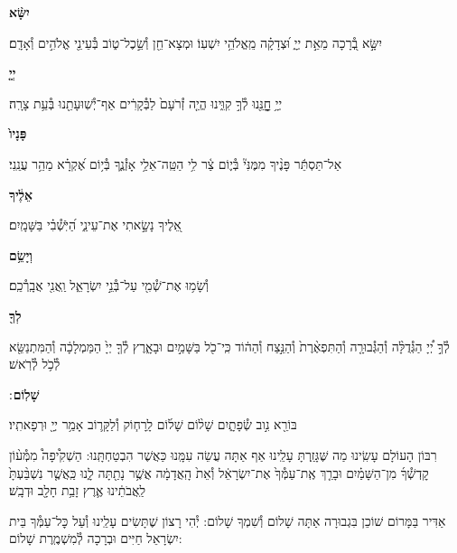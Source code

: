 \documentclass[twoside, openany, parskip=half, 11pt]{book}
\begin{document}
\textbf{יִשָּׂ֨א}
\hfill \begin{footnotesize}
יִשָּׂ֣א בְ֭֯רָכָה מֵאֵ֣ת יְיָ֑ וּ֝צְדָקָ֗ה מֵֽאֱלֹהֵ֥י יִשְׁעֽוֹ׃ וּמְצָא־חֵ֖ן וְ֯שֵׂ֣כֶל־ט֑וֹב בְּ֯עֵינֵ֖י אֱלֹהִ֣ים וְ֯אָדָֽם׃\\
\end{footnotesize}
\textbf{יְיָ֤}
\hfill \begin{footnotesize}
יְיָ֥ חׇׇׇׇׇנֵּ֖נוּ לְ֯ךָ֣ קִוִּ֑ינוּ הֱיֵ֤ה זְ֯רֹעָם֙ לַבְּ֯קָרִ֔ים אַף־יְ֯שֽׁוּעָתֵ֖נוּ בְּ֯עֵ֥ת צָרָֽה׃\\
\end{footnotesize}
\textbf{פָּנָיו֙}
\hfill \begin{footnotesize}
אַל־תַּסְתֵּ֬ר פָּנֶ֨יךָ מִמֶּנִּי֘ בְּ֯י֢וֹם צַ֫ר לִ֥י הַטֵּֽה־אֵלַ֥י אָזְ֯נֶ֑ךָ
בְּ֯י֥וֹם אֶ֝קְרָ֗א מַהֵ֥ר עֲנֵֽנִי׃\\
\end{footnotesize}
\textbf{אֵלֶ֔יךָ}
\hfill \begin{footnotesize}
אֵ֭לֶיךָ נָשָׂ֣אתִי אֶת־עֵינַ֑י הַ֝יֹּֽשְׁ֯בִ֗י בַּשָּׁמָֽיִם׃\\
\end{footnotesize}
\textbf{וְיָשֵׂ֥ם}
\hfill \begin{footnotesize}
וְ֯שָׂמ֥וּ אֶת־שְׁ֯מִ֖י עַל־בְּ֯נֵ֣י יִשְׂרָאֵ֑ל וַֽאֲנִ֖י אֲבָֽרְ֯כֵֽם׃\\
\end{footnotesize}
\textbf{לְךָ֖}
\hfill \begin{footnotesize}
לְ֯ךָ֣ יְ֠יָ הַגְּ֯דֻלָּ֨ה וְ֯הַגְּ֯בוּרָ֤ה וְ֯הַתִּפְאֶ֨רֶת֙ וְ֯הַנֵּ֣צַח וְ֯הַה֔וֹד
כִּֽי־כֹ֖ל בַּשָּׁמַ֣יִם וּבָאָ֑רֶץ לְ֯ךָ֤ יְיָ֙ הַמַּמְלָכָ֔ה וְ֯הַמִּתְנַשֵּׂ֖א
לְ֯כֹ֥ל לְ֯רֹֽאשׁ׃\\
\end{footnotesize}
\textbf{שָׁלֽוֹם}
׃ \hfill \begin{footnotesize}
בּוֹרֵ֖א נִ֣וב שְׂ֯פָתָ֑יִם שָׁל֨וֹם שָׁל֜וֹם לָֽרָח֧וֹק וְ֯לַקָּר֛וֹב
אָמַ֥ר יְיָ֖ וּרְפָאתִֽיו׃
\end{footnotesize}

\clearpage

\begin{paracol}{2}
רִבּוֹן הָעוֹלָם עָשִֽׂינוּ מַה שֶּׁגָּזַֽרְתָּ עָלֵֽינוּ אַף אַתָּה עֲשֵׂה עִמָּֽנוּ כַּאֲשֶׁר הִבְטַחְתָּֽנוּ: הַשְׁקִ֩יפָה֩ מִמְּ֯ע֨וֹן קׇדְשְׁ֯ךָ֜ מִן־הַשָּׁמַ֗יִם וּבָרֵ֤ךְ אֶֽת־עַמְּ֯ךָ֙ אֶת־יִשְׂרָאֵ֔ל וְ֯אֵת֙ הָֽאֲדָמָ֔ה אֲשֶׁ֥ר נָתַ֖תָּה לָ֑נוּ כַּֽאֲשֶׁ֤ר נִשְׁבַּ֨עְתָּ֙ לַֽאֲבֹתֵ֔ינוּ אֶ֛רֶץ זָבַ֥ת חָלָ֖ב וּדְבָֽשׁ׃

\switchcolumn

\kahal
אַדִּיר בַּמָּרוֹם שׁוֹכֵן בִּגְבוּרָה אַתָּה שָׁלוֹם וְ֯שִׁמְךָ שָׁלוֹם: יְ֯הִי רָצוֹן שֶׁתָּשִׂים עָלֵֽינוּ וְ֯עַל כׇּל־עַמְּ֯ךָ בֵּית יִשְׂרָאֵל חַיִּים וּבְרָכָה לְ֯מִשְׁמֶֽרֶת שָׁלוֹם:
\end{paracol}
\end{document}
